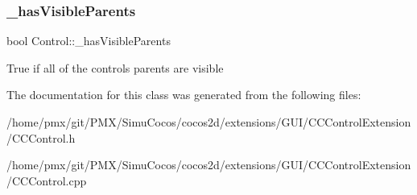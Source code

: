 \subsubsection{\texorpdfstring{\+\_\+has\+Visible\+Parents}{\_hasVisibleParents}}
{\footnotesize\ttfamily bool Control\+::\+\_\+has\+Visible\+Parents\hspace{0.3cm}{\ttfamily [protected]}}

True if all of the controls parents are visible 

The documentation for this class was generated from the following files\+:\begin{DoxyCompactItemize}
\item 
/home/pmx/git/\+P\+M\+X/\+Simu\+Cocos/cocos2d/extensions/\+G\+U\+I/\+C\+C\+Control\+Extension/C\+C\+Control.\+h\item 
/home/pmx/git/\+P\+M\+X/\+Simu\+Cocos/cocos2d/extensions/\+G\+U\+I/\+C\+C\+Control\+Extension/C\+C\+Control.\+cpp\end{DoxyCompactItemize}
